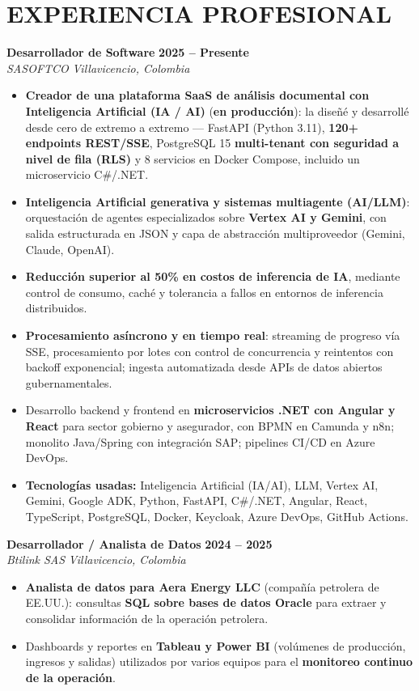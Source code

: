 \documentclass[letterpaper,10pt]{article}
\begin{document}
\section{EXPERIENCIA PROFESIONAL}

\textbf{Desarrollador de Software} \hfill \textbf{2025 -- Presente} \\
\textit{SASOFTCO} \hfill \textit{Villavicencio, Colombia}
\begin{itemize}
    \item \textbf{Creador de una plataforma SaaS de análisis documental con Inteligencia Artificial (IA / AI)} (\textbf{en producción}): la diseñé y desarrollé desde cero de extremo a extremo — FastAPI (Python 3.11), \textbf{120+ endpoints REST/SSE}, PostgreSQL 15 \textbf{multi-tenant con seguridad a nivel de fila (RLS)} y 8 servicios en Docker Compose, incluido un microservicio C\#/.NET.
    \item \textbf{Inteligencia Artificial generativa y sistemas multiagente (AI/LLM)}: orquestación de agentes especializados sobre \textbf{Vertex AI y Gemini}, con salida estructurada en JSON y capa de abstracción multiproveedor (Gemini, Claude, OpenAI).
    \item \textbf{Reducción superior al 50\% en costos de inferencia de IA}, mediante control de consumo, caché y tolerancia a fallos en entornos de inferencia distribuidos.
    \item \textbf{Procesamiento asíncrono y en tiempo real}: streaming de progreso vía SSE, procesamiento por lotes con control de concurrencia y reintentos con backoff exponencial; ingesta automatizada desde APIs de datos abiertos gubernamentales.
    \item Desarrollo backend y frontend en \textbf{microservicios .NET con Angular y React} para sector gobierno y asegurador, con BPMN en Camunda y n8n; monolito Java/Spring con integración SAP; pipelines CI/CD en Azure DevOps.
    \item \textbf{Tecnologías usadas:} Inteligencia Artificial (IA/AI), LLM, Vertex AI, Gemini, Google ADK, Python, FastAPI, C\#/.NET, Angular, React, TypeScript, PostgreSQL, Docker, Keycloak, Azure DevOps, GitHub Actions.
\end{itemize}

\textbf{Desarrollador / Analista de Datos} \hfill \textbf{2024 -- 2025} \\
\textit{Btilink SAS} \hfill \textit{Villavicencio, Colombia}
\begin{itemize}
    \item \textbf{Analista de datos para Aera Energy LLC} (compañía petrolera de EE.UU.): consultas \textbf{SQL sobre bases de datos Oracle} para extraer y consolidar información de la operación petrolera.
    \item Dashboards y reportes en \textbf{Tableau y Power BI} (volúmenes de producción, ingresos y salidas) utilizados por varios equipos para el \textbf{monitoreo continuo de la operación}.
\end{itemize}
\end{document}
